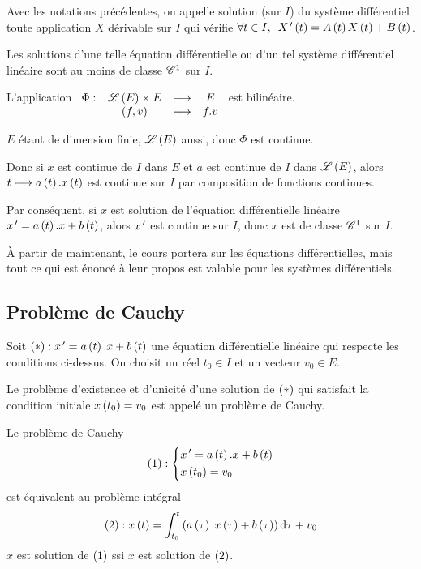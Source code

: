 \begin{defi}
Avec les notations précédentes, on appelle solution (sur \(I\)) du système différentiel toute application \(X\) dérivable sur \(I\) qui vérifie \(\quantifs{\forall t\in I}X\prim\paren{t}=A\paren{t}X\paren{t}+B\paren{t}\).
\end{defi}

\begin{prop}
Les solutions d'une telle équation différentielle ou d'un tel système différentiel linéaire sont au moins de classe \(\mathscr{C}^{1}\) sur \(I\).
\end{prop}

\begin{dem}
L'application \(\begin{array}[t]{cccc}\Phi : & \mathscr{L}\left(E\right)\times E & \longrightarrow & E \\ & \left(f,v\right) & \longmapsto & f.v\end{array}\) est bilinéaire.

\(E\) étant de dimension finie, \(\mathscr{L}\left(E\right)\) aussi, donc \(\Phi\) est continue.

Donc si \(x\) est continue de \(I\) dans \(E\) et \(a\) est continue de \(I\) dans \(\mathscr{L}\left(E\right)\), alors \(t\longmapsto a\left(t\right).x\left(t\right)\) est continue sur \(I\) par composition de fonctions continues.

Par conséquent, si \(x\) est solution de l'équation différentielle linéaire \(x^{\,\prime}=a\left(t\right).x+b\left(t\right)\), alors \(x^{\,\prime}\) est continue sur \(I\), donc \(x\) est de classe \(\mathscr{C}^{1}\) sur \(I\).
\end{dem}

À partir de maintenant, le cours portera sur les équations différentielles, mais tout ce qui est énoncé à leur propos est valable pour les systèmes différentiels.

\subsection{Problème de Cauchy}

\begin{defi}
Soit \(\left(*\right):x^{\,\prime}=a\left(t\right).x+b\left(t\right)\) une équation différentielle linéaire qui respecte les conditions ci-dessus. On choisit un réel \(t_0\in I\) et un vecteur \(v_0\in E\).

Le problème d'existence et d'unicité d'une solution de \(\left(*\right)\) qui satisfait la condition initiale \(x\left(t_0\right)=v_0\) est appelé un problème de Cauchy.
\end{defi}

Le problème de Cauchy \[\left(1\right):\begin{dcases}
    x^{\,\prime}=a\left(t\right).x+b\left(t\right) \\
    x\left(t_0\right)=v_0
\end{dcases}\] est équivalent au problème intégral \[\paren{2}:x\paren{t}=\int_{t_0}^t\paren{a\paren{\tau}.x\paren{\tau}+b\paren{\tau}}\odif{\tau}+v_0\] \ie \(x\) est solution de \(\left(1\right)\) ssi \(x\) est solution de \(\left(2\right)\).

